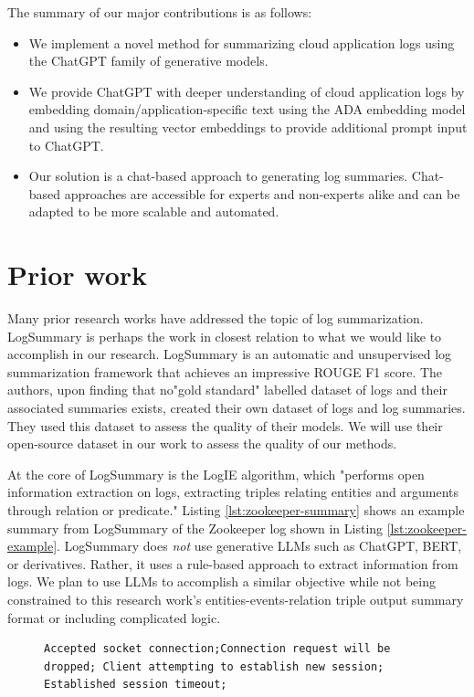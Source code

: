 \documentclass[conference]{IEEEtran}
\begin{document}
The summary of our major contributions is as follows:

\begin{itemize}
    \item We implement a novel method for summarizing cloud application logs using the ChatGPT family of generative models.
    \item We provide ChatGPT with deeper understanding of cloud application logs by embedding domain/application-specific text using the ADA embedding model and using the resulting vector embeddings to provide additional prompt input to ChatGPT.
    \item Our solution is a chat-based approach to generating log summaries. Chat-based approaches are accessible for experts and non-experts alike and can be adapted to be more scalable and automated.
\end{itemize}

\section{Prior work}

Many prior research works have addressed the topic of log summarization. LogSummary \cite{10017337} is perhaps the work in closest relation to what we would like to accomplish in our research. LogSummary is an automatic and unsupervised log summarization framework that achieves an impressive ROUGE F1 score. The authors, upon finding that no"gold standard" labelled dataset of logs and their associated summaries exists, created their own dataset of logs and log summaries. They used this dataset to assess the quality of their models. We will use their open-source dataset in our work to assess the quality of our methods.

At the core of LogSummary is the LogIE algorithm, which "performs open information extraction on logs, extracting triples relating entities and arguments through relation or predicate." \cite{10017337} Listing \ref{lst:zookeeper-summary} shows an example summary from LogSummary of the Zookeeper log shown in Listing \ref{lst:zookeeper-example}. LogSummary does \textit{not} use generative LLMs such as ChatGPT, BERT, or derivatives. Rather, it uses a rule-based approach to extract information from logs. We plan to use LLMs to accomplish a similar objective while not being constrained to this research work's entities-events-relation triple output summary format or including complicated logic.

\begin{figure}[h]
\begin{lstlisting}[numbers=none, caption=LogSummary Zookeeper Summary, label={lst:zookeeper-summary}]
 Accepted socket connection;Connection request will be dropped; Client attempting to establish new session; Established session timeout;
\end{lstlisting}
\end{figure} 
\end{document}

